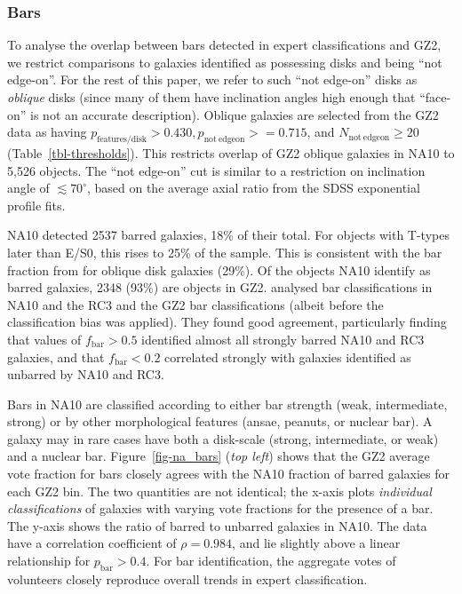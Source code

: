\documentclass[useAMS,usenatbib]{mn2e}
\begin{document}


\subsubsection{Bars}\label{sssec-bars}

To analyse the overlap between bars detected in expert classifications and GZ2, we restrict comparisons to galaxies identified as possessing disks and being ``not edge-on''. For the rest of this paper, we refer to such ``not edge-on'' disks as {\em oblique} disks (since many of them have inclination angles high enough that ``face-on'' is not an accurate description). Oblique galaxies are selected from the GZ2 data as having $p_\mathrm{features/disk}>0.430, p_\mathrm{not~edgeon}>=0.715$, and $N_\mathrm{not~edgeon}\geq20$ (Table~\ref{tbl-thresholds}). This restricts overlap of GZ2 oblique galaxies in NA10 to 5,526 objects. The ``not edge-on'' cut is similar to a restriction on inclination angle of $\lesssim70^\circ$, based on the average axial ratio from the SDSS exponential profile fits.

NA10 detected 2537 barred galaxies, 18\% of their total. For objects with T-types later than E/S0, this rises to 25\% of the sample. This is consistent with the bar fraction from \citep{mas11c} for oblique disk galaxies (29\%). Of the objects NA10 identify as barred galaxies, 2348 (93\%) are objects in GZ2. \citet{mas11c} analysed bar classifications in NA10 and the RC3 and the GZ2 bar classifications (albeit before the classification bias was applied). They found good agreement, particularly finding that values of $f_\mathrm{bar}>0.5$ identified almost all strongly barred NA10 and RC3 galaxies, and that $f_\mathrm{bar}<0.2$ correlated strongly with galaxies identified as unbarred by NA10 and RC3. 

Bars in NA10 are classified according to either bar strength (weak, intermediate, strong) or by other morphological features (ansae, peanuts, or nuclear bar). A galaxy may in rare cases have both a disk-scale (strong, intermediate, or weak) and a nuclear bar. Figure~\ref{fig-na_bars} ({\it top left}) shows that the GZ2 average vote fraction for bars closely agrees with the NA10 fraction of barred galaxies for each GZ2 bin. The two quantities are not identical; the x-axis plots {\it individual classifications} of galaxies with varying vote fractions for the presence of a bar. The y-axis shows the ratio of barred to unbarred galaxies in NA10. The data have a correlation coefficient of $\rho=0.984$, and lie slightly above a linear relationship for $p_\mathrm{bar}>0.4$. For bar identification, the aggregate votes of volunteers closely reproduce overall trends in expert classification. 
\end{document}
